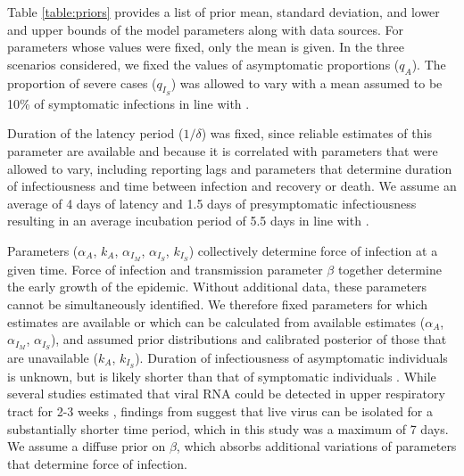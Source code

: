 \documentclass[11pt]{article}
\begin{document}
Table \ref{table:priors} provides a list of prior mean, standard deviation, and lower and upper bounds of the model parameters along with data sources. For parameters whose values were fixed, only the mean is given. In the three scenarios considered, we fixed the values of asymptomatic proportions ($q_A$). The proportion of severe cases ($q_{I_S}$) was allowed to vary with a mean assumed to be 10\% of symptomatic infections in line with \citep{verity2020estimates, bi2020epidemiology, salje2020estimating, lane2020country}. 

Duration of the latency period ($1/\delta$) was fixed, since reliable estimates of this parameter are available and because it is correlated with parameters that were allowed to vary, including reporting lags and parameters that determine duration of infectiousness and time between infection and recovery or death. We assume an average of 4 days of latency \citep{li2020substantial, salje2020estimating} and 1.5 days of presymptomatic infectiousness \citep{wei2020presymptomatic} resulting in an average incubation period of 5.5 days in line with \citep{lauer2020incubation, bi2020epidemiology, li2020early, linton2020incubation, he2020estimation, salje2020estimating, cdc2020scenarios}. 

Parameters ($\alpha_A$, $k_A$, $\alpha_{I_M}$, $\alpha_{I_S}$, $k_{I_S}$) collectively determine force of infection at a given time. Force of infection and transmission parameter $\beta$ together
determine the early growth of the epidemic. Without additional data, these parameters cannot be simultaneously identified. We therefore fixed parameters for which estimates are available or which can be calculated from available estimates ($\alpha_A$, $\alpha_{I_M}$, $\alpha_{I_S}$), and assumed prior distributions and calibrated posterior of those that are unavailable ($k_A$, $k_{I_S}$). 
Duration of infectiousness of asymptomatic individuals is unknown, but is likely shorter than that of symptomatic individuals \citep{yang2020comparison}. While several studies estimated that viral RNA could be detected in upper respiratory tract for 2-3 weeks \citep{young2020epidemiologic, kujawski2020clinical}, findings from \citep{wolfel2020virological} suggest that live virus can be isolated for a substantially shorter time period, which in this study was a maximum of 7 days. 
We assume a diffuse prior on $\beta$, which absorbs additional variations of parameters that determine force of infection. 
\end{document}
